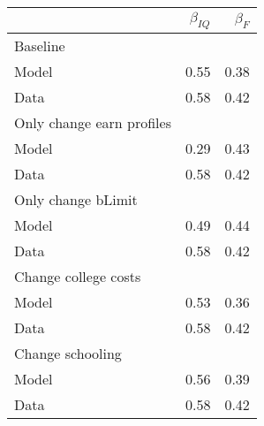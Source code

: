 \begin{tabular}{lrr}
\hline
  & $\beta_{IQ}$  & $\beta_{F}$  \\ 
\hline
Baseline &   &   \\ 
Model & 0.55  & 0.38  \\ 
Data & 0.58  & 0.42  \\ 
Only change earn profiles &   &   \\ 
Model & 0.29  & 0.43  \\ 
Data & 0.58  & 0.42  \\ 
Only change bLimit &   &   \\ 
Model & 0.49  & 0.44  \\ 
Data & 0.58  & 0.42  \\ 
Change college costs &   &   \\ 
Model & 0.53  & 0.36  \\ 
Data & 0.58  & 0.42  \\ 
Change schooling &   &   \\ 
Model & 0.56  & 0.39  \\ 
Data & 0.58  & 0.42  \\ 
\hline
\end{tabular}%
